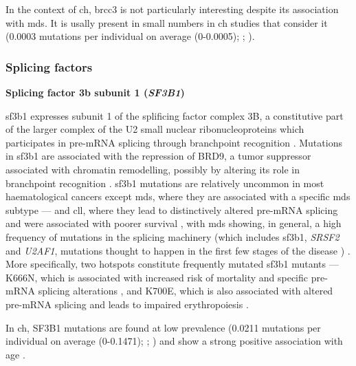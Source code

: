 In the context of \ac{ch}, \ac{brcc3} is not particularly interesting despite its association with \ac{mds}. It is usally present in small numbers in \ac{ch} studies that consider it \cite{Jaiswal2014-rl,Genovese2014-eu,Acuna-Hidalgo2017-ng} (0.0003 mutations per individual on average (0-0.0005); ; ). 

\subsubsection{Splicing factors}

\noindent \textbf{Splicing factor 3b subunit 1 (\textit{SF3B1})}

\Ac{sf3b1} expresses subunit 1 of the splificing factor complex 3B, a constitutive part of the larger complex of the U2 small nuclear ribonucleoproteins which participates in pre-mRNA splicing \cite{Fica2013-vn,Kramer1995-mw,Isono2001-yf} through branchpoint recognition \cite{Gozani1998-ox}. Mutations in \ac{sf3b1} are associated with the repression of BRD9, a tumor suppressor associated with chromatin remodelling, possibly by altering its role in branchpoint recognition \cite{Inoue2019-ra}. \ac{sf3b1} mutations are relatively uncommon in most haematological cancers except \ac{mds}, where they are associated with a specific \ac{mds} subtype \cite{Papaemmanuil2011-nr,Hellstrom_Lindberg2015-zs} --- and \ac{cll}, where they lead to distinctively altered pre-mRNA splicing and were associated with poorer survival \cite{Wang2011-wu,Quesada2011-xc}, with \ac{mds} showing, in general, a high frequency of mutations in the splicing machinery (which includes \ac{sf3b1}, \textit{SRSF2} and \textit{U2AF1}, mutations thought to happen in the first few stages of the disease \cite{Haferlach2014-bh,Papaemmanuil2013-yt,Nagata2019-hn}) \cite{Yoshida2011-zp}. More specifically, two hotspots constitute frequently mutated \ac{sf3b1} mutants --- K666N, which is associated with increased risk of mortality and specific pre-mRNA splicing alterations \cite{Dalton2020-mg}, and K700E, which is also associated with altered pre-mRNA splicing and leads to impaired erythropoiesis \cite{Obeng2016-bw}.

In \ac{ch}, SF3B1 mutations are found at low prevalence \cite{Jaiswal2014-rl,Genovese2014-eu,Zink2017-zi,Bolton2020-ct,Coombs2017-ph,McKerrell2015-rl,Acuna-Hidalgo2017-ng,Desai2018-pj,Young2016-du,Young2019-rz} (0.0211 mutations per individual on average (0-0.1471); ; ) and show a strong positive association with age \cite{Bolton2020-ct,Xie2014-np,McKerrell2015-rl}. 

